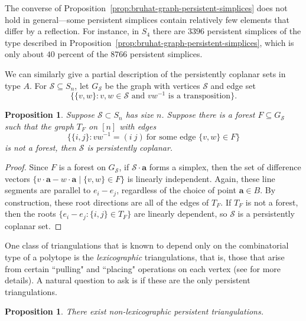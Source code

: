 \documentclass{amsart}
\newtheorem{prop}[thm]{Proposition}
\theoremstyle{definition}
\def\ba{\mathbf{a}}
\def\cS{\mathcal{S}}
\begin{document}
The converse of Proposition~\ref{prop:bruhat-graph-persistent-simplices} does not hold in general---some persistent simplices contain relatively few elements that differ by a reflection. For instance, in $S_4$ there are $3396$ persistent simplices of the type described in Proposition~\ref{prop:bruhat-graph-persistent-simplices}, which is only about $40$ percent of the $8766$ persistent simplices.

We can similarly give a partial description of the persistently coplanar sets in type $A$. For $\cS \subseteq S_n$, let $G_{\cS}$ be the graph with vertices $\cS$ and edge set 
\[\{\{v, w\}: v, w \in \cS \text{ and } vw^{-1} \text{ is a transposition}\}.\] 

\begin{prop}\label{prop:coplanar-sufficient-cond}
    Suppose $\cS \subset S_n$ has size $n$. Suppose there is a forest $F \subseteq G_{\cS}$ such that the graph $T_F$ on $[n]$ with edges 
    \[\{\{i, j\}: vw^{-1}=(i~j)~\text{for some edge }\{v,w\} \in F\}\]
    is not a forest, then $\cS$ is persistently coplanar.
\end{prop}


\begin{proof}
    Since $F$ is a forest on $G_\cS$, if $\cS\cdot \ba$ forms a simplex, then the set of difference vectors $\{v\cdot \ba-w\cdot \ba\mid \{v,w\}\in F\}$ is linearly independent. Again, these line segments are parallel to $e_i-e_j$, regardless of the choice of point $\ba\in B$. By construction, these root directions are all of the edges of $T_F$. If $T_F$ is not a forest, then the roots $\{e_i - e_j: \{i, j\} \in T_F\}$ are linearly dependent, so $\cS$ is a persistently coplanar set.
\end{proof}

One class of triangulations that is known to depend only on the combinatorial type of a polytope is the \emph{lexicographic} triangulations, that is, those that arise from certain ``pulling" and ``placing" operations on each vertex (see \cite[Section 4.3.3]{DLRS10} for more details). A natural question to ask is if these are the only persistent triangulations.

\begin{prop}
    There exist non-lexicographic persistent triangulations.
\end{prop}
\end{document}
